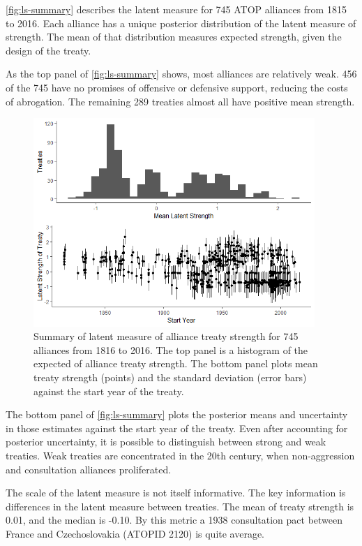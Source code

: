 \documentclass[12pt]{article}
\begin{document}
\autoref{fig:ls-summary} describes the latent measure for 745 ATOP alliances from 1815 to 2016.
Each alliance has a unique posterior distribution of the latent measure of strength. 
The mean of that distribution measures expected strength, given the design of the treaty.


As the top panel of \autoref{fig:ls-summary} shows, most alliances are relatively weak.
456 of the 745 have no promises of offensive or defensive support, reducing the costs of abrogation. 
The remaining 289 treaties almost all have positive mean strength. 


\begin{figure}
	\centering
		\includegraphics[width=0.95\textwidth]{../figures/ls-summary.png}
	\caption{Summary of latent measure of alliance treaty strength for 745 alliances from 1816 to 2016. The top panel is a histogram of the expected of alliance treaty strength. The bottom panel plots mean treaty strength (points) and the standard deviation (error bars) against the start year of the treaty.}
	\label{fig:ls-summary}
\end{figure}
	
	
The bottom panel of \autoref{fig:ls-summary} plots the posterior means and uncertainty in those estimates against the start year of the treaty. 
Even after accounting for posterior uncertainty, it is possible to distinguish between strong and weak treaties. 
Weak treaties are concentrated in the 20th century, when non-aggression and consultation alliances proliferated. 


The scale of the latent measure is not itself informative. 
The key information is differences in the latent measure between treaties. 
The mean of treaty strength is 0.01, and the median is -0.10. 
By this metric a 1938 consultation pact between France and Czechoslovakia (ATOPID 2120) is quite average. 
\end{document}
